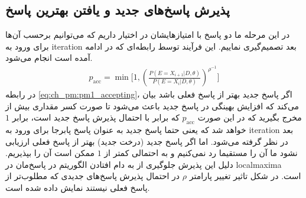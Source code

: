 \subsection{پذیرش پاسخ‌های جدید و یافتن بهترین پاسخ}
در این مرحله ما دو پاسخ با امتیازهایشان در اختیار داریم که می‌توانیم برحسب آن‌ها برای ورود به \gls{iteration} بعد تصمیم‌گیری نماییم. این فرآیند توسط رابطه‌ای که در ادامه آمده است انجام می‌شود.
\begin{eqnarray}
	p_{\text{acc}} = \min\Bigg[1, \left(\frac{P(E=X_{i+1}|D, \theta)}{P(E=X_{i}|D, \theta)}\right)^{\rho^{-1}}\Bigg]
	 \label{eq:ch_pm:pm1_accepting} 
\end{eqnarray}
در رابطه \ref{eq:ch_pm:pm1_accepting}، اگر پاسخ جدید بهتر از پاسخ فعلی باشد بیان می‌کند که افزایش بهینگی در پاسخ جدید باعث می‌شود تا صورت کسر مقداری بیش از مخرج بگیرید که در این صورت $p_{\text{acc}}$ که برابر با احتمال پذیرش پاسخ جدید است، برابر $1$ خواهد شد که یعنی حتما پاسخ جدید به عنوان پاسخ پابرجا برای ورود به \gls{iteration} بعد در نظر گرفته می‌شود. اما اگر پاسخ جدید (درخت جدید) بهتر از پاسخ فعلی ارزیابی نشود ما آن را مستقیما رد نمی‌کنیم و به احتمالی کمتر از $1$ ممکن است آن را بپذیریم. دلیل این پذیرش جلوگیری از به دام افتادن الگوریتم در پاسخ‌مان در \gls{localmaxima} است. در شکل \label{fig:ch_pm:pm1_rho} تاثیر تغییر پارامتر $\rho$ در احتمال پذیرش پاسخ‌های جدیدی که مطلوب‌تر از پاسخ فعلی نیستند نمایش داده شده است.

